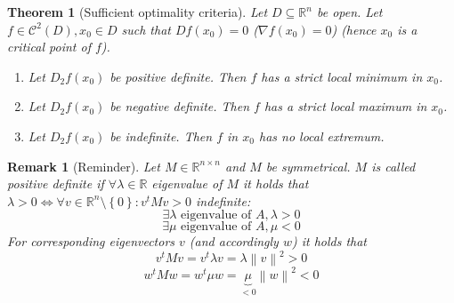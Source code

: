 \documentclass{article}
\newtheorem{theorem}{Theorem}  \numberwithin{theorem}{section}
\newtheorem{remark}{Remark}  \numberwithin{remark}{section}
\newcommand{\set}[1]{\left\{#1\right\}}
\newcommand{\norm}[1]{\left\|#1\right\|}
\begin{document}
\begin{theorem}[Sufficient optimality criteria] %
  Let $D \subseteq \mathbb R^n$ be open. Let $f \in \mathcal C^2(D), x_0 \in D$
  such that $Df(x_0) = 0$ ($\nabla f(x_0) = 0$) (hence $x_0$ is a critical point of $f$).
  \begin{enumerate}
    \item Let $D_2 f(x_0)$ be positive definite. Then $f$ has a strict local minimum in $x_0$.
    \item Let $D_2 f(x_0)$ be negative definite. Then $f$ has a strict local maximum in $x_0$.
    \item Let $D_2 f(x_0)$ be indefinite. Then $f$ in $x_0$ has no local extremum.
  \end{enumerate}
\end{theorem}

\begin{remark}[Reminder]
  Let $M \in \mathbb R^{n \times n}$ and $M$ be symmetrical. $M$ is called positive definite if $\forall \lambda \in \mathbb R$ eigenvalue of $M$ it holds that $\lambda > 0 \iff \forall v \in \mathbb R^n \setminus \set{0}: v^t M v > 0$ indefinite:
  \[ \exists \lambda \text{ eigenvalue of } A, \lambda > 0 \]
  \[ \exists \mu \text{ eigenvalue of } A, \mu < 0 \]
  For corresponding eigenvectors $v$ (and accordingly $w$) it holds that
  \[ v^t M v = v^t \lambda v = \lambda \norm{v}^2 > 0 \]
  \[ w^t M w = w^t \mu w = \underbrace{\mu}_{< 0} \norm{w}^2 < 0 \]
\end{remark}
\end{document}
